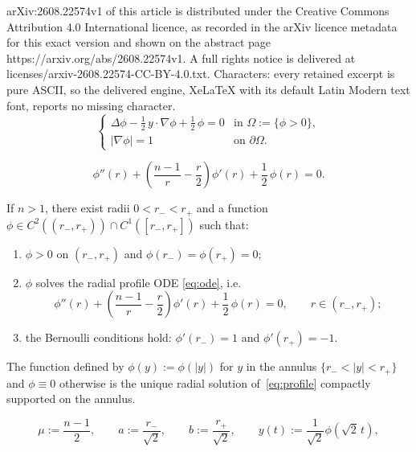 \documentclass[10pt,a4paper]{amsart}
\begin{document}
arXiv:2608.22574v1 of this article is distributed under the Creative Commons Attribution 4.0 International licence, as recorded in the arXiv licence metadata for this exact version and shown on the abstract page https://arxiv.org/abs/2608.22574v1. A full rights notice is delivered at licenses/arxiv-2608.22574-CC-BY-4.0.txt. Characters: every retained excerpt is pure ASCII, so the delivered engine, XeLaTeX with its default Latin Modern text font, reports no missing character.
\begin{equation}\label{eq:profile}
\left\{\begin{array}{ll}
	\Delta\phi - \tfrac{1}{2}\,y \cdot \nabla\phi + \tfrac{1}{2}\,\phi = 0 & \text{in } \Omega:= \{\phi>0\}, \\
	|\nabla\phi| = 1 & \text{on } \partial\Omega.
\end{array}   \right.\tag{P}
\end{equation}

\begin{equation}\label{eq:ode}
    \phi''(r) + \left(\frac{n-1}{r} - \frac{r}{2}\right) \phi'(r) + \frac{1}{2}\,\phi(r) = 0.\tag{RP}
\end{equation}

\begin{proposition}\label{prop:odesol}
If $n>1$, there exist radii $0 < r_- < r_+$ and a function $\phi \in C^2((r_-,r_+)) \cap C^1([r_-,r_+])$ such that:
\begin{enumerate}
\item[\textup{(i)}] $\phi > 0$ on $(r_-,r_+)$ and $\phi(r_-) = \phi(r_+) = 0$;
\item[\textup{(ii)}] $\phi$ solves the radial profile ODE \eqref{eq:ode}, i.e.
\[
\phi''(r) + \left(\frac{n-1}{r} - \frac{r}{2}\right)\phi'(r) + \frac{1}{2}\,\phi(r) = 0, \qquad r \in (r_-,r_+);
\]
\item[\textup{(iii)}] the Bernoulli conditions hold: $\phi'(r_-) = 1$ and $\phi'(r_+) = -1$.
\end{enumerate}
The function defined by $\phi(y) := \phi(|y|)$ for $y$ in the annulus $\{r_- < |y| < r_+\}$ and $\phi \equiv 0$ otherwise is the unique radial solution of~\eqref{eq:profile} compactly supported on the annulus.
\end{proposition}

\begin{equation}\label{eq:annular-scaled-notation}
    \mu:=\frac{n-1}{2},
    \qquad
    a:=\frac{r_-}{\sqrt2},
    \qquad
    b:=\frac{r_+}{\sqrt2},
    \qquad
    y(t):=\frac1{\sqrt2}\phi(\sqrt2\,t),
\end{equation}
\end{document}
